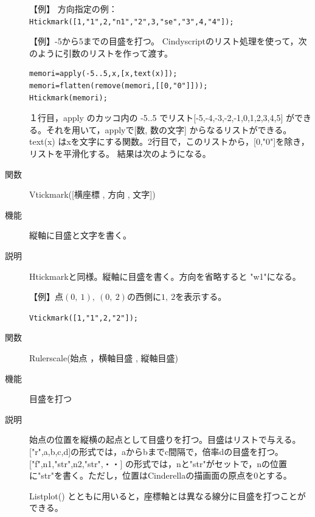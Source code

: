 \documentclass[papersize,a4paper,12pt,uplatex]{jsarticle}
\begin{document}
\begin{description}
\vspace{\baselineskip}
【例】 方向指定の例：\verb|Htickmark([1,"1",2,"n1","2",3,"se","3",4,"4"]);|

\vspace{\baselineskip}
\begin{center}

\end{center}

【例】-5から5までの目盛を打つ。
Cindyscriptのリスト処理を使って，次のように引数のリストを作って渡す。
\begin{verbatim}
memori=apply(-5..5,x,[x,text(x)]);
memori=flatten(remove(memori,[[0,"0"]]));
Htickmark(memori);
\end{verbatim}
１行目，apply のカッコ内の -5..5 でリスト[-5,-4,-3,-2,-1,0,1,2,3,4,5] ができる。それを用いて，applyで[数, 数の文字] からなるリストができる。text(x) はxを文字にする関数。2行目で，このリストから，[0,"0"]を除き，リストを平滑化する。 結果は次のようになる。

\begin{center} \scalebox{0.8}{}\end{center}

\hypertarget{vtickmark}{}
\item[関数]Vtickmark([横座標 , 方向 , 文字])
\item[機能]縦軸に目盛と文字を書く。
\item[説明]Htickmarkと同様。縦軸に目盛を書く。方向を省略すると "w1"になる。

\vspace{\baselineskip}
【例】点$(0,\ 1),\ (0,\ 2)$の西側に$1,\ 2$を表示する。

\hspace{10mm}\verb|Vtickmark([1,"1",2,"2"]);|

\vspace{\baselineskip}
\hypertarget{rulerscale}{}
\item[関数]Rulerscale(始点 ，横軸目盛 , 縦軸目盛)
\item[機能]目盛を打つ
\item[説明]始点の位置を縦横の起点として目盛りを打つ。目盛はリストで与える。
["r",a,b,c,d]の形式では，aからbまでc間隔で，倍率dの目盛を打つ。
["f",n1,"str",n2,"str",・・] の形式では，nと"str"がセットで，nの位置に"str"を書く。ただし，位置はCinderellaの描画面の原点を0とする。

Listplot() とともに用いると，座標軸とは異なる線分に目盛を打つことができる。


\end{description}
\end{document}
